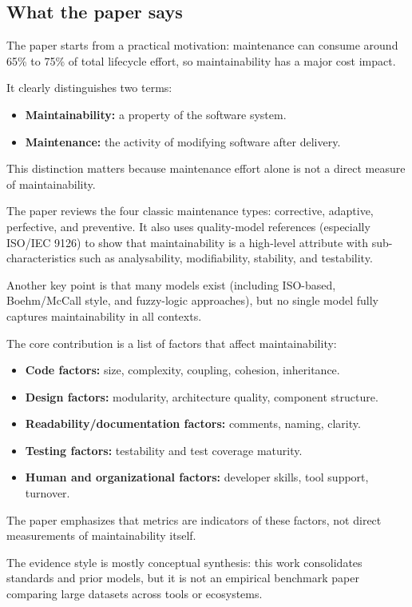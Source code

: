 \documentclass[11pt,a4paper]{article}
\begin{document}
\subsection{What the paper says}
The paper starts from a practical motivation: maintenance can consume around 65\% to 75\% of total lifecycle effort, so maintainability has a major cost impact.

It clearly distinguishes two terms:
\begin{itemize}[leftmargin=*]
  \item \textbf{Maintainability:} a property of the software system.
  \item \textbf{Maintenance:} the activity of modifying software after delivery.
\end{itemize}
This distinction matters because maintenance effort alone is not a direct measure of maintainability.

The paper reviews the four classic maintenance types: corrective, adaptive, perfective, and preventive. It also uses quality-model references (especially ISO/IEC 9126) to show that maintainability is a high-level attribute with sub-characteristics such as analysability, modifiability, stability, and testability.

Another key point is that many models exist (including ISO-based, Boehm/McCall style, and fuzzy-logic approaches), but no single model fully captures maintainability in all contexts.

The core contribution is a list of factors that affect maintainability:
\begin{itemize}[leftmargin=*]
  \item \textbf{Code factors:} size, complexity, coupling, cohesion, inheritance.
  \item \textbf{Design factors:} modularity, architecture quality, component structure.
  \item \textbf{Readability/documentation factors:} comments, naming, clarity.
  \item \textbf{Testing factors:} testability and test coverage maturity.
  \item \textbf{Human and organizational factors:} developer skills, tool support, turnover.
\end{itemize}

The paper emphasizes that metrics are indicators of these factors, not direct measurements of maintainability itself.

The evidence style is mostly conceptual synthesis: this work consolidates standards and prior models, but it is not an empirical benchmark paper comparing large datasets across tools or ecosystems.
\end{document}
